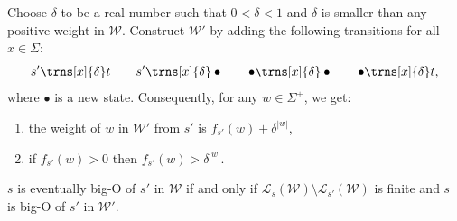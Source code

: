 \documentclass[10pt,a4paper]{amsart}
\numberwithin{equation}{section}
\theoremstyle{plain}
\theoremstyle{definition}
\theoremstyle{remark}
\newcommand\lng[2]{\mathcal{L}_{#1}(#2)}
\newcommand\wa{\mathcal{W}}
\renewcommand\nu{f}
\begin{document}
Choose $\delta$ to be a real number such that $0 < \delta < 1$ and $\delta$ is smaller than any positive weight in $\wa$.
Construct $\wa'$ by adding the following transitions for all $x\in\Sigma$:
\[
s'\trns[x]{\delta} t \qquad s'\trns[x]{\delta} \bullet \qquad \bullet \trns[x]{\delta} \bullet \qquad \bullet \trns[x]{\delta} t,
\]
where $\bullet$ is a new state. Consequently, for any $w\in\Sigma^+$, we get:
\begin{enumerate}
\item the weight of $w$ in $\wa'$ from $s'$ is $\nu_{s'}(w)+\delta^{|w|}$,
\item if $\nu_{s'}(w)>0$ then $\nu_{s'}(w) > \delta^{|w|}$.
\end{enumerate}
\begin{prop}
$s$ is eventually big-O of $s'$ in $\wa$ if and only if $\lng{s}{\wa}\setminus\lng{s'}{\wa}$ is finite and $s$ is big-O of $s'$ in $\wa'$.
\end{prop}
\end{document}
